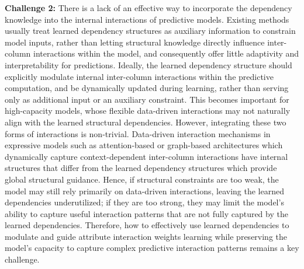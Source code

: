 \documentclass[conference]{IEEEtran}
\newcommand{\icde}[1]{{\color{black}#1}}
\newcommand{\zjic}[1]{{\color{black}#1}}
\newcommand{\syic}[1]{{\color{black}#1}}
\begin{document}
\textbf{Challenge 2:}
\syic{
There is a lack of an effective way to incorporate the dependency knowledge into the internal interactions of predictive models.
}
\syic{Existing methods usually treat learned dependency structures as auxiliary information to constrain model inputs, rather than letting structural knowledge directly influence inter-column interactions within the model, and consequently offer little adaptivity and interpretability for predictions.}
\syic{Ideally, the learned dependency structure should \syic{explicitly} modulate internal inter-column interactions \syic{within the predictive computation}, 
and be dynamically updated during learning, rather than serving only as additional input or an auxiliary constraint.}
\syic{
This becomes important for high-capacity models, whose flexible data-driven interactions may not naturally align with the learned structural dependencies.
}
However, 
\syic{integrating these two forms of interactions is non-trivial.}
\icde{
\syic{Data-driven interaction mechanisms in expressive models such as attention-based or graph-based architectures which dynamically capture context-dependent inter-column interactions have internal structures that differ from \zjic{the learned dependency structures which provide global structural guidance.}
}
}
\syic{Hence, if structural constraints are too weak, the model may still rely primarily on data-driven interactions, leaving the learned dependencies underutilized; if they are too strong, they may limit the model's ability to capture useful interaction patterns \syic{that are not fully captured by the learned dependencies.} 
Therefore, how to effectively use learned dependencies to \syic{modulate and guide attribute interaction weights learning} while preserving the model's capacity to capture complex predictive interaction patterns remains a key challenge.}
\end{document}

